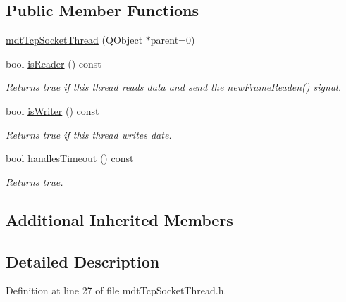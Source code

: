 \subsection*{Public Member Functions}
\begin{DoxyCompactItemize}
\item 
\hyperlink{classmdt_tcp_socket_thread_ab379d78b2d32a9361dbe46a009c687d4}{mdt\-Tcp\-Socket\-Thread} (Q\-Object $\ast$parent=0)
\item 
bool \hyperlink{classmdt_tcp_socket_thread_a3224f12c8ff8d695975030f3f6215010}{is\-Reader} () const 
\begin{DoxyCompactList}\small\item\em Returns true if this thread reads data and send the \hyperlink{classmdt_port_thread_a7fc2245c753fd65e1beffec211c41461}{new\-Frame\-Readen()} signal. \end{DoxyCompactList}\item 
bool \hyperlink{classmdt_tcp_socket_thread_a014ad2b3a5fbe7031eeb1d42d8f0767d}{is\-Writer} () const 
\begin{DoxyCompactList}\small\item\em Returns true if this thread writes date. \end{DoxyCompactList}\item 
bool \hyperlink{classmdt_tcp_socket_thread_aa14c9838dfb8d2defac449b8b58bbc7c}{handles\-Timeout} () const 
\begin{DoxyCompactList}\small\item\em Returns true. \end{DoxyCompactList}\end{DoxyCompactItemize}
\subsection*{Additional Inherited Members}


\subsection{Detailed Description}


Definition at line 27 of file mdt\-Tcp\-Socket\-Thread.\-h.



